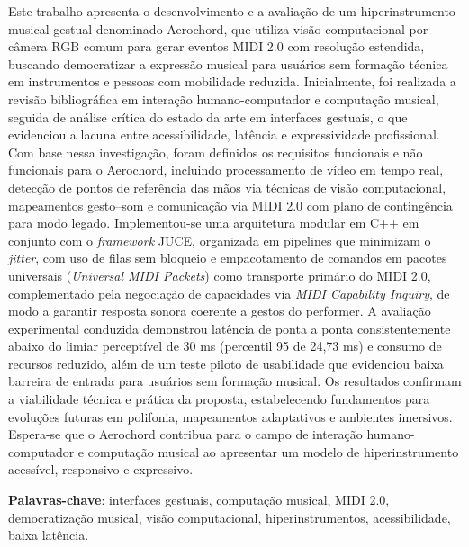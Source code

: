\setlength{\absparsep}{18pt}

\begin{resumo}[RESUMO]
Este trabalho apresenta o desenvolvimento e a avaliação de um hiperinstrumento musical gestual denominado Aerochord, que utiliza visão computacional por câmera RGB comum para gerar eventos MIDI 2.0 com resolução estendida, buscando democratizar a expressão musical para usuários sem formação técnica em instrumentos e pessoas com mobilidade reduzida. Inicialmente, foi realizada a revisão bibliográfica em interação humano-computador e computação musical, seguida de análise crítica do estado da arte em interfaces gestuais, o que evidenciou a lacuna entre acessibilidade, latência e expressividade profissional. Com base nessa investigação, foram definidos os requisitos funcionais e não funcionais para o Aerochord, incluindo processamento de vídeo em tempo real, detecção de pontos de referência das mãos via técnicas de visão computacional, mapeamentos gesto–som e comunicação via MIDI 2.0 com plano de contingência para modo legado. Implementou-se uma arquitetura modular em C++ em conjunto com o \textit{framework} JUCE, organizada em pipelines que minimizam o \textit{jitter}, com uso de filas sem bloqueio e empacotamento de comandos em pacotes universais (\textit{Universal MIDI Packets}) como transporte primário do MIDI 2.0, complementado pela negociação de capacidades via \textit{MIDI Capability Inquiry}, de modo a garantir resposta sonora coerente a gestos do performer. A avaliação experimental conduzida demonstrou latência de ponta a ponta consistentemente abaixo do limiar perceptível de 30 ms (percentil 95 de 24,73 ms) e consumo de recursos reduzido, além de um teste piloto de usabilidade que evidenciou baixa barreira de entrada para usuários sem formação musical. Os resultados confirmam a viabilidade técnica e prática da proposta, estabelecendo fundamentos para evoluções futuras em polifonia, mapeamentos adaptativos e ambientes imersivos. Espera-se que o Aerochord contribua para o campo de interação humano-computador e computação musical ao apresentar um modelo de hiperinstrumento acessível, responsivo e expressivo.

\textbf{Palavras-chave}: interfaces gestuais, computação musical, MIDI 2.0, democratização musical, visão computacional, hiperinstrumentos, acessibilidade, baixa latência.
\end{resumo}